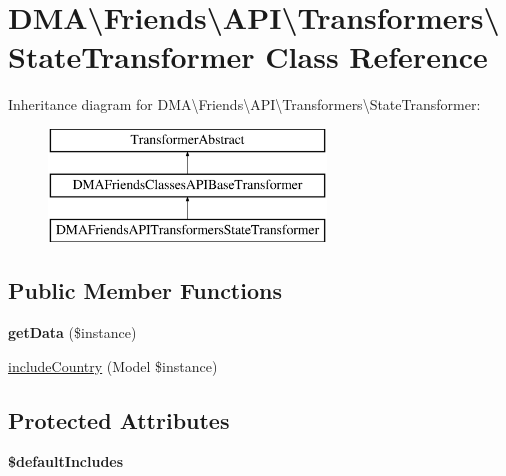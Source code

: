 \hypertarget{classDMA_1_1Friends_1_1API_1_1Transformers_1_1StateTransformer}{}\section{D\+M\+A\textbackslash{}Friends\textbackslash{}A\+P\+I\textbackslash{}Transformers\textbackslash{}State\+Transformer Class Reference}
\label{classDMA_1_1Friends_1_1API_1_1Transformers_1_1StateTransformer}
Inheritance diagram for D\+M\+A\textbackslash{}Friends\textbackslash{}A\+P\+I\textbackslash{}Transformers\textbackslash{}State\+Transformer\+:\begin{figure}[H]
\begin{center}
\leavevmode
\includegraphics[height=3.000000cm]{de/de0/classDMA_1_1Friends_1_1API_1_1Transformers_1_1StateTransformer}
\end{center}
\end{figure}
\subsection*{Public Member Functions}
\begin{DoxyCompactItemize}
\item 
\hypertarget{classDMA_1_1Friends_1_1API_1_1Transformers_1_1StateTransformer_a46336282d30845ae189715cfee04be15}{}{\bfseries get\+Data} (\$instance)\label{classDMA_1_1Friends_1_1API_1_1Transformers_1_1StateTransformer_a46336282d30845ae189715cfee04be15}

\item 
\hyperlink{classDMA_1_1Friends_1_1API_1_1Transformers_1_1StateTransformer_aa5b7cf3a2ea5908778ee989979295e35}{include\+Country} (Model \$instance)
\end{DoxyCompactItemize}
\subsection*{Protected Attributes}
\begin{DoxyCompactItemize}
\item 
{\bfseries \$default\+Includes}
\end{DoxyCompactItemize}


